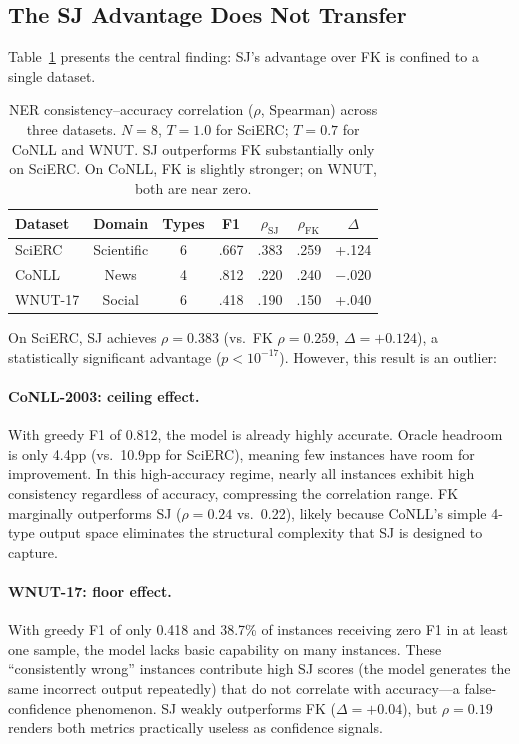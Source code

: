 \documentclass[11pt,a4paper]{article}
\begin{document}
\subsection{The SJ Advantage Does Not Transfer}

Table~\ref{tab:cross_dataset} presents the central finding: SJ's advantage over FK is confined to a single dataset.

\begin{table}[t]
\centering
\small
\begin{tabular}{lcccccc}
\toprule
\textbf{Dataset} & \textbf{Domain} & \textbf{Types} & \textbf{F1} & $\rho_{\text{SJ}}$ & $\rho_{\text{FK}}$ & $\Delta$ \\
\midrule
SciERC & Scientific & 6 & .667 & .383 & .259 & +.124 \\
CoNLL & News & 4 & .812 & .220 & .240 & $-$.020 \\
WNUT-17 & Social & 6 & .418 & .190 & .150 & +.040 \\
\bottomrule
\end{tabular}
\caption{NER consistency--accuracy correlation ($\rho$, Spearman) across three datasets. $N{=}8$, $T{=}1.0$ for SciERC; $T{=}0.7$ for CoNLL and WNUT. SJ outperforms FK substantially only on SciERC. On CoNLL, FK is slightly stronger; on WNUT, both are near zero.}
\label{tab:cross_dataset}
\end{table}

On SciERC, SJ achieves $\rho{=}0.383$ (vs.\ FK $\rho{=}0.259$, $\Delta{=}+0.124$), a statistically significant advantage ($p < 10^{-17}$).
However, this result is an outlier:

\paragraph{CoNLL-2003: ceiling effect.}
With greedy F1 of 0.812, the model is already highly accurate.
Oracle headroom is only 4.4pp (vs.\ 10.9pp for SciERC), meaning few instances have room for improvement.
In this high-accuracy regime, nearly all instances exhibit high consistency regardless of accuracy, compressing the correlation range.
FK marginally outperforms SJ ($\rho{=}0.24$ vs.\ 0.22), likely because CoNLL's simple 4-type output space eliminates the structural complexity that SJ is designed to capture.

\paragraph{WNUT-17: floor effect.}
With greedy F1 of only 0.418 and 38.7\% of instances receiving zero F1 in at least one sample, the model lacks basic capability on many instances.
These ``consistently wrong'' instances contribute high SJ scores (the model generates the same incorrect output repeatedly) that do not correlate with accuracy---a false-confidence phenomenon.
SJ weakly outperforms FK ($\Delta{=}+0.04$), but $\rho{=}0.19$ renders both metrics practically useless as confidence signals.
\end{document}
